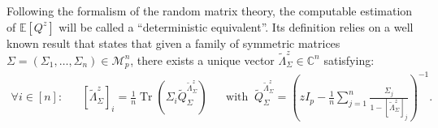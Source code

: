 \documentclass{ws-rmta}
\DeclareMathOperator{\tr}{Tr}
\begin{document}
Following the formalism of the random matrix theory, the computable estimation of $\mathbb E[Q^z]$ will be called a ``deterministic equivalent''.
Its definition relies on a well known result that states that given a family of symmetric matrices $\Sigma = (\Sigma_1,\ldots, \Sigma_n) \in \mathcal{M}_{p}^n$, there exists a unique vector $\tilde \Lambda_\Sigma^z \in \mathbb C^n$ satisfying:
  \begin{align*}
    \forall i\in [n]:&
    &[\tilde \Lambda_\Sigma^z]_i = \frac{1}{n} \tr \left( \Sigma_i \tilde Q_\Sigma^{\tilde \Lambda_\Sigma^z} \right)&
    &\text{with } \ \tilde Q_{\Sigma}^{\tilde \Lambda_\Sigma^z} = \left( zI_p - \frac{1}{n}  \sum_{j=1}^n \frac{\Sigma_j}{1 - [\tilde \Lambda_\Sigma^z]_j} \right)^{-1}.
  \end{align*}
\end{document}

